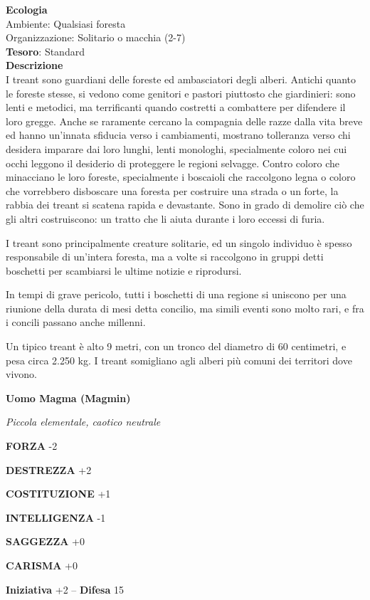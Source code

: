 \begin{multicols}{2}
\textbf{Ecologia}\\
Ambiente: Qualsiasi foresta\\
Organizzazione: Solitario o macchia (2-7)\\
\textbf{Tesoro}: Standard\\
\textbf{Descrizione}\\
I treant sono guardiani delle foreste ed ambasciatori degli alberi. Antichi quanto le foreste stesse, si vedono come genitori e pastori piuttosto che giardinieri: sono lenti e metodici, ma terrificanti quando costretti a combattere per difendere il loro gregge. Anche se raramente cercano la compagnia delle razze dalla vita breve ed hanno un'innata sfiducia verso i cambiamenti, mostrano tolleranza verso chi desidera imparare dai loro lunghi, lenti monologhi, specialmente coloro nei cui occhi leggono il desiderio di proteggere le regioni selvagge. Contro coloro che minacciano le loro foreste, specialmente i boscaioli che raccolgono legna o coloro che vorrebbero disboscare una foresta per costruire una strada o un forte, la rabbia dei treant si scatena rapida e devastante. Sono in grado di demolire ciò che gli altri costruiscono: un tratto che li aiuta durante i loro eccessi di furia.

I treant sono principalmente creature solitarie, ed un singolo individuo è spesso responsabile di un'intera foresta, ma a volte si raccolgono in gruppi detti boschetti per scambiarsi le ultime notizie e riprodursi.

In tempi di grave pericolo, tutti i boschetti di una regione si uniscono per una riunione della durata di mesi detta concilio, ma simili eventi sono molto rari, e fra i concili passano anche millenni.

Un tipico treant è alto 9 metri, con un tronco del diametro di 60 centimetri, e pesa circa 2.250 kg. I treant somigliano agli alberi più comuni dei territori dove vivono.

\medskip{}\textbf{Uomo Magma (Magmin)}

\textit{Piccola elementale, caotico neutrale}

\textbf{FORZA} -2

\textbf{DESTREZZA} +2

\textbf{COSTITUZIONE} +1

\textbf{INTELLIGENZA} -1

\textbf{SAGGEZZA} +0

\textbf{CARISMA} +0

\textbf{Iniziativa} +2 -- \textbf{Difesa} 15


\end{multicols}
